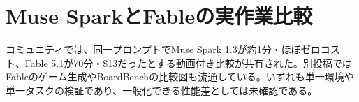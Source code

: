 \section{Muse SparkとFableの実作業比較}
コミュニティでは、同一プロンプトでMuse Spark 1.3が約1分・ほぼゼロコスト、Fable 5.1が70分・\$13だったとする動画付き比較が共有された。別投稿ではFableのゲーム生成やBoardBenchの比較図も流通している。いずれも単一環境や単一タスクの検証であり、一般化できる性能差としては未確認である。
